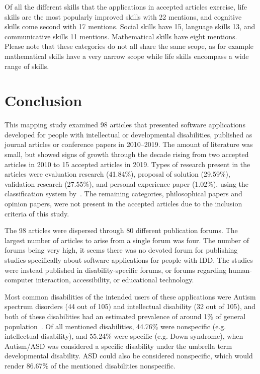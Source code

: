 \documentclass[utf8,english]{gradu3}
\begin{document}
Of all the different skills that the applications in accepted articles exercise,
life skills are the most popularly improved skills with 22 mentions,
and cognitive skills come second with 17 mentions.
Social skills have 15, language skills 13, and communicative skills 11 mentions.
Mathematical skills have eight mentions.
Please note that these categories do not all share the same scope,
as for example mathematical skills have a very narrow scope while
life skills encompass a wide range of skills.


\chapter{Conclusion}

This mapping study examined 98 articles that presented software applications
developed for people with intellectual or developmental disabilities,
published as journal articles or conference papers in 2010--2019.
The amount of literature was small, but showed signs of growth through the decade
rising from two accepted articles in 2010 to 15 accepted articles in 2019.
Types of research present in the articles were
evaluation research (41.84\%),
proposal of solution (29.59\%),
validation research (27.55\%), and
personal experience paper (1.02\%),
using the classification system by~\textcite{wieringa2006requirements}.
The remaining categories, philosophical papers and opinion papers,
were not present in the accepted articles due to the inclusion criteria of this study.

The 98 articles were dispersed through 80 different publication forums.
The largest number of articles to arise from a single forum was four.
The number of forums being very high, it seems there was no
devoted forum for publishing studies specifically about software applications
for people with IDD. The studies were instead published in disability-specific
forums, or forums regarding human-computer interaction, accessibility,
or educational technology.

Most common disabilities of the intended users of these applications
were Autism spectrum disorders (44 out of 105) and intellectual disability (32 out of 105),
and both of these disabilities had an estimated prevalence of around 1\% of general population~\parencite{dsm5}.
Of all mentioned disabilities, 44.76\% were nonspecific (e.g. intellectual disability),
and 55.24\% were specific (e.g. Down syndrome),
when Autism/ASD was considered a specific disability under the umbrella term developmental disability.
ASD could also be considered nonspecific, which would render
86.67\% of the mentioned disabilities nonspecific.
\end{document}
